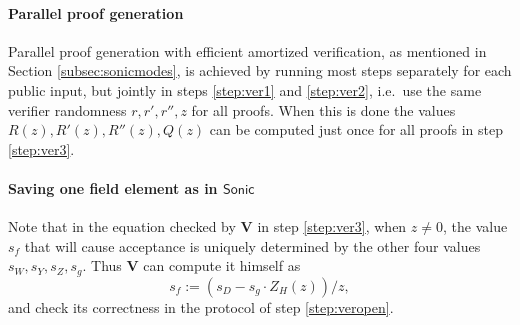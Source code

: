 \documentclass[11pt]{article}
\numberwithin{figure}{section} %
\newcommand{\defeq}{:=}
\newcommand{\ver}{\ensuremath{\mathsf{\mathbf{V}}}\xspace}
\newcommand{\sonic}{\ensuremath{\mathsf{Sonic}}\xspace}
\begin{document}
\paragraph{Parallel proof generation}
Parallel proof generation with efficient amortized verification, as mentioned in Section \ref{subsec:sonicmodes}, is achieved by running most steps separately for each public input, but jointly in steps \ref{step:ver1} and \ref{step:ver2}, i.e.\ use the same verifier randomness $r,r',r'',z$ for all proofs. When this is done the values $R(z),R'(z),R''(z),Q(z)$ can be computed just once for all proofs in step \ref{step:ver3}.

\paragraph{Saving one field element as in \sonic}
Note that in the equation checked by \ver in step \ref{step:ver3}, when $z\neq 0$, the value $s_f$ that will cause acceptance is uniquely determined by the other four values $s_W,s_Y,s_Z,s_g$.
Thus \ver can compute it himself as \[s_f\defeq \left(s_D - s_g \cdot Z_H(z)\right)/z,\]
and check its correctness in the protocol \open of step \ref{step:veropen}. 
\end{document}
